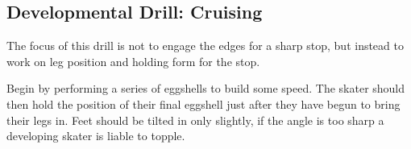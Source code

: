 \subsection{Developmental Drill: Cruising} 
\label{drill:stopping/plough/cruising}


The focus of this drill is not to engage the edges for a sharp stop, but instead to work on leg position and holding form for the stop.  

Begin by performing a series of eggshells to build some speed. 
The skater should then hold the position of their final eggshell just after they have begun to bring their legs in.   
Feet should be tilted in only slightly, if the angle is too sharp a developing skater is liable to topple. 
